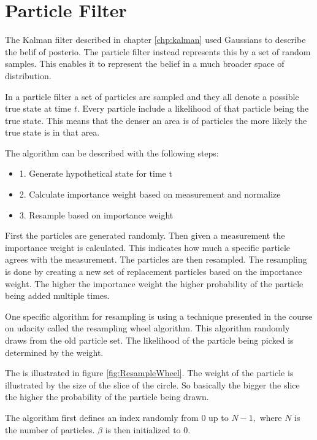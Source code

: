 \chapter{Particle Filter}
\label{chp:partFilter}

The Kalman filter described in chapter \ref{chp:kalman} used Gaussians to describe the belif of posterio. The particle filter instead represents this by a set of random samples. This enables it to represent the belief in a much broader space of distribution.

In a particle filter a set of particles are sampled and they all denote a possible true state at time $t$. Every particle include a likelihood of that particle being the true state. This means that the denser an area is of particles the more likely the true state is in that area.

The algorithm can be described with the following steps:
\begin{itemize}
	\item 1. Generate hypothetical state for time t 
	\item 2. Calculate importance weight based on measurement and normalize
	\item 3. Resample based on importance weight
\end{itemize}

First the particles are generated randomly. Then given a measurement the importance weight is calculated. This indicates how much a specific particle agrees with the measurement. The particles are then resampled. The resampling is done by creating a new set of replacement particles based on the importance weight. The higher the importance weight the higher probability of the particle being added multiple times.

One specific algorithm for resampling is using a technique presented in the course on udacity called the resampling wheel algorithm. This algorithm randomly draws from the old particle set. The likelihood of the particle being picked is determined by the weight.



The is illustrated in figure \ref{fig:ResampleWheel}. The weight of the particle is illustrated by the size of the slice of the circle. So basically the bigger the slice the higher the probability of the particle being drawn.

\FloatBarrier
The algorithm first defines an index randomly from 0 up to $N-1,$ where $N$ is the number of particles. $\beta$ is then initialized to 0. 

